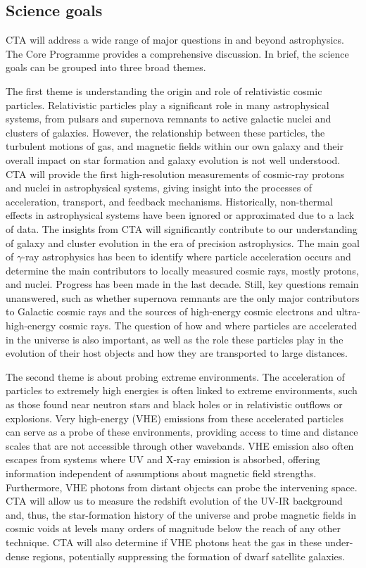 \subsection{Science goals}
\label{s:science-goals}
CTA will address a wide range of major questions in and beyond astrophysics. The Core Programme \cite{ScienceWithCherenkovTelescopeArray2018} provides a comprehensive discussion. In brief, the science goals can be grouped into three broad themes. 

The first theme is understanding the origin and role of relativistic cosmic particles. Relativistic particles play a significant role in many astrophysical systems, from pulsars and supernova remnants to active galactic nuclei and clusters of galaxies. However, the relationship between these particles, the turbulent motions of gas, and magnetic fields within our own galaxy and their overall impact on star formation and galaxy evolution is not well understood. CTA will provide the first high-resolution measurements of cosmic-ray protons and nuclei in astrophysical systems, giving insight into the processes of acceleration, transport, and feedback mechanisms. Historically, non-thermal effects in astrophysical systems have been ignored or approximated due to a lack of data. The insights from CTA will significantly contribute to our understanding of galaxy and cluster evolution in the era of precision astrophysics. The main goal of $\gamma$-ray astrophysics has been to identify where particle acceleration occurs and determine the main contributors to locally measured cosmic rays, mostly protons, and nuclei. Progress has been made in the last decade. Still, key questions remain unanswered, such as whether supernova remnants are the only major contributors to Galactic cosmic rays and the sources of high-energy cosmic electrons and ultra-high-energy cosmic rays. The question of how and where particles are accelerated in the universe is also important, as well as the role these particles play in the evolution of their host objects and how they are transported to large distances.

The second theme is about probing extreme environments. The acceleration of particles to extremely high energies is often linked to extreme environments, such as those found near neutron stars and black holes or in relativistic outflows or explosions. Very high-energy (VHE) emissions from these accelerated particles can serve as a probe of these environments, providing access to time and distance scales that are not accessible through other wavebands. VHE emission also often escapes from systems where UV and X-ray emission is absorbed, offering information independent of assumptions about magnetic field strengths. Furthermore, VHE photons from distant objects can probe the intervening space. CTA will allow us to measure the redshift evolution of the UV-IR background and, thus, the star-formation history of the universe and probe magnetic fields in cosmic voids at levels many orders of magnitude below the reach of any other technique. CTA will also determine if VHE photons heat the gas in these under-dense regions, potentially suppressing the formation of dwarf satellite galaxies.

